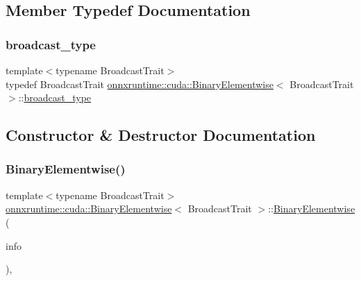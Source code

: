 \subsection{Member Typedef Documentation}
\mbox{\label{classonnxruntime_1_1cuda_1_1BinaryElementwise_a6b23a26618db540bab3ea9073b798a56}} 
\subsubsection{\texorpdfstring{broadcast\+\_\+type}{broadcast\_type}}
{\footnotesize\ttfamily template$<$typename Broadcast\+Trait$>$ \\
typedef Broadcast\+Trait \mbox{\hyperlink{classonnxruntime_1_1cuda_1_1BinaryElementwise}{onnxruntime\+::cuda\+::\+Binary\+Elementwise}}$<$ Broadcast\+Trait $>$\+::\mbox{\hyperlink{classonnxruntime_1_1cuda_1_1BinaryElementwise_a6b23a26618db540bab3ea9073b798a56}{broadcast\+\_\+type}}\hspace{0.3cm}{\ttfamily [protected]}}



\subsection{Constructor \& Destructor Documentation}
\mbox{\label{classonnxruntime_1_1cuda_1_1BinaryElementwise_a5e501927ce96138fa54117f613657a7a}} 
\subsubsection{\texorpdfstring{Binary\+Elementwise()}{BinaryElementwise()}}
{\footnotesize\ttfamily template$<$typename Broadcast\+Trait$>$ \\
\mbox{\hyperlink{classonnxruntime_1_1cuda_1_1BinaryElementwise}{onnxruntime\+::cuda\+::\+Binary\+Elementwise}}$<$ Broadcast\+Trait $>$\+::\mbox{\hyperlink{classonnxruntime_1_1cuda_1_1BinaryElementwise}{Binary\+Elementwise}} (\begin{DoxyParamCaption}\item[{const \mbox{\hyperlink{classonnxruntime_1_1OpKernelInfo}{Op\+Kernel\+Info}} \&}]{info }\end{DoxyParamCaption})\hspace{0.3cm}{\ttfamily [inline]}, {\ttfamily [protected]}}



